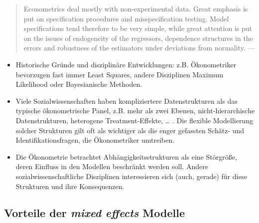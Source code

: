 \documentclass[
]{book}
\begin{document}
\begin{quote}
Econometrics deal mostly with non-experimental data. Great emphasis is put on specification procedures and misspecification testing. Model specifications tend therefore to be very simple, while great attention is put on the issues of endogeneity of the regressors, dependence structures in the errors and robustness of the estimators under deviations from normality. --- \citet{plm2008}
\end{quote}

\begin{itemize}
\item
  Historische Gründe und disziplinäre Entwicklungen: z.B. Ökonometriker bevorzugen fast immer Least Squares, andere Disziplinen Maximum Likelihood oder Bayesianische Methoden.
\item
  Viele Sozialwissenschaften haben kompliziertere Datenstrukturen als das typische ökonometrische Panel, z.B. mehr als zwei Ebenen, nicht-hierarchische Datenstrukturen, heterogene Treatment-Effekte, \ldots{} . Die flexible Modellierung solcher Strukturen gilt oft als wichtiger als die enger gefassten Schätz- und Identifikationsfragen, die Ökonometriker umtreiben.
\item
  Die Ökonometrie betrachtet Abhängigkeitsstrukturen als eine Störgröße, deren Einfluss in den Modellen beschränkt werden soll. Andere sozialwissenschaftliche Disziplinen interessieren sich (auch, gerade) für diese Strukturen und ihre Konsequenzen.
\end{itemize}

\hypertarget{vorteile-der-mixed-effects-modelle}{%
\subsection{\texorpdfstring{Vorteile der \emph{mixed effects} Modelle}{Vorteile der mixed effects Modelle}}\label{vorteile-der-mixed-effects-modelle}}
\end{document}
